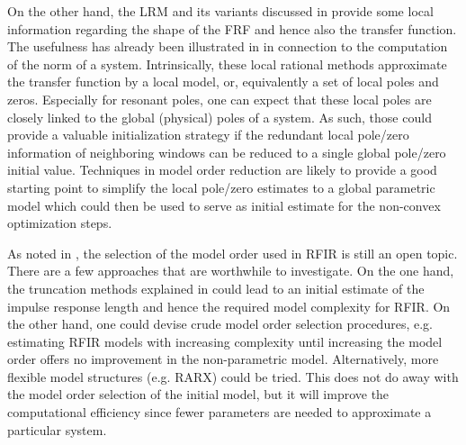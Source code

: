   On the other hand, the \gls{LRM} and its variants discussed in  provide some local information regarding the shape of the \gls{FRF} and hence also the transfer function.
  The usefulness has already been illustrated in  in connection to the computation of the \Hinf norm of a system.
  Intrinsically, these local rational methods approximate the transfer function by a local model, or, equivalently a set of local poles and zeros.
  Especially for resonant poles, one can expect that these local poles are closely linked to the global (physical) poles of a system.
  As such, those could provide a valuable initialization strategy if the redundant local pole/zero information of neighboring windows can be reduced to a single global pole/zero initial value.
  Techniques in model order reduction are likely to provide a good starting point to simplify the local pole/zero estimates to a global parametric model which could then be used to serve as initial estimate for the non-convex optimization steps.

As noted in , the selection of the model order used in \gls{RFIR} is still an open topic.
There are a few approaches that are worthwhile to investigate.
On the one hand, the truncation methods explained in  could lead to an initial estimate of the impulse response length and hence the required model complexity for \gls{RFIR}.
On the other hand, one could devise crude model order selection procedures, e.g.  estimating \gls{RFIR} models with increasing complexity until increasing the model order offers no improvement in the non-parametric model.
Alternatively, more flexible model structures (e.g. \gls{RARX}) could be tried.
This does not do away with the model order selection of the initial model, but it will improve the computational efficiency since fewer parameters are needed to approximate a particular system.

  
